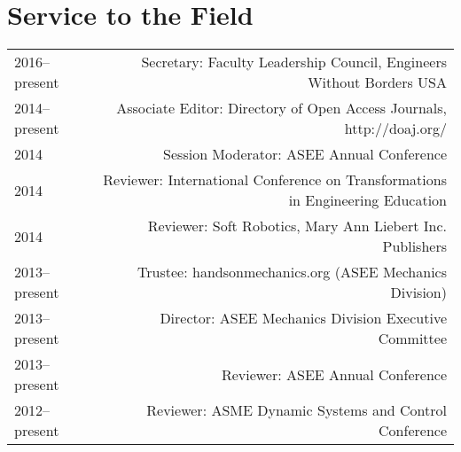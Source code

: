 \section*{Service to the Field}
\begin{tabular}{L!{\VRule}R}
2016--present&Secretary: Faculty Leadership Council, Engineers Without Borders USA\\
2014--present&Associate Editor: Directory of Open Access Journals, http://doaj.org/\\
2014&Session Moderator: ASEE Annual Conference\\
2014&Reviewer: International Conference on Transformations in Engineering Education\\
2014&Reviewer: Soft Robotics, Mary Ann Liebert Inc. Publishers\\
2013--present&Trustee: handsonmechanics.org (ASEE Mechanics Division)\\
2013--present&Director: ASEE Mechanics Division Executive Committee\\
2013--present&Reviewer: ASEE Annual Conference\\
2012--present&Reviewer: ASME Dynamic Systems and Control Conference\\
\end{tabular}